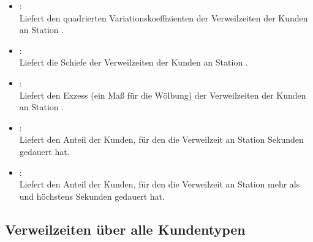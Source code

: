 \begin{itemize}
\item
{}:\\
Liefert den quadrierten Variationskoeffizienten der Verweilzeiten der Kunden an Station .

\item
{}:\\
Liefert die Schiefe der Verweilzeiten der Kunden an Station .

\item
{}:\\
Liefert den Exzess (ein Maß für die Wölbung) der Verweilzeiten der Kunden an Station .

\item
{}:\\
Liefert den Anteil der Kunden, für den die Verweilzeit an Station   Sekunden gedauert hat.

\item
{}:\\
Liefert den Anteil der Kunden, für den die Verweilzeit an Station  mehr als  und höchstens  Sekunden gedauert hat.

\end{itemize}



\subsection{Verweilzeiten über alle Kundentypen}
  
